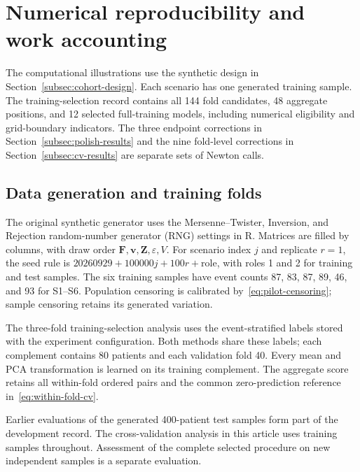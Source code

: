\section{Numerical reproducibility and work accounting}
\label{app:reproducibility}
The computational illustrations use the synthetic design in Section~\ref{subsec:cohort-design}. Each scenario has one generated training sample. The training-selection record contains all 144 fold candidates, 48 aggregate positions, and 12 selected full-training models, including numerical eligibility and grid-boundary indicators. The three endpoint corrections in Section~\ref{subsec:polish-results} and the nine fold-level corrections in Section~\ref{subsec:cv-results} are separate sets of Newton calls.

\subsection{Data generation and training folds}
The original synthetic generator uses the Mersenne--Twister, Inversion, and Rejection random-number generator (RNG) settings in R. Matrices are filled by columns, with draw order $\bm{F},\bm{v},\bm{Z},\varepsilon,V$. For scenario index $j$ and replicate $r=1$, the seed rule is $20260929+100000j+100r+\mathrm{role}$, with roles 1 and 2 for training and test samples. The six training samples have event counts 87, 83, 87, 89, 46, and 93 for S1--S6. Population censoring is calibrated by~\eqref{eq:pilot-censoring}; sample censoring retains its generated variation.

The three-fold training-selection analysis uses the event-stratified labels stored with the experiment configuration. Both methods share these labels; each complement contains 80 patients and each validation fold 40. Every mean and PCA transformation is learned on its training complement. The aggregate score retains all within-fold ordered pairs and the common zero-prediction reference in~\eqref{eq:within-fold-cv}.

Earlier evaluations of the generated 400-patient test samples form part of the development record. The cross-validation analysis in this article uses training samples throughout. Assessment of the complete selected procedure on new independent samples is a separate evaluation.

